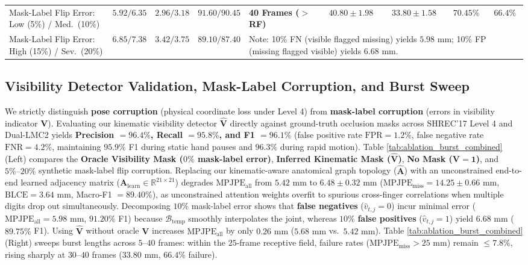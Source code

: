 \documentclass[10pt,twocolumn]{article}
\begin{document}
\begin{table}[!t]
{\begin{tabular}{lccc|lcccc}
Mask-Label Flip Error: Low (5\%) / Med.\ (10\%) & $5.92 / 6.35$ & $2.96 / 3.18$ & $91.60 / 90.45$ & \textbf{40 Frames ($>$ RF)} & $40.80 \pm 1.98$ & $33.80 \pm 1.58$ & $70.45\%$ & $66.4\%$ \\
Mask-Label Flip Error: High (15\%) / Sev.\ (20\%) & $6.85 / 7.38$ & $3.42 / 3.75$ & $89.10 / 87.40$ & \multicolumn{5}{l}{\footnotesize *Note: 10\% FN (visible flagged missing) yields $5.98\text{ mm}$; 10\% FP (missing flagged visible) yields $6.68\text{ mm}$.} \\
\bottomrule
\end{tabular}
}
\end{table}

\subsection{Visibility Detector Validation, Mask-Label Corruption, and Burst Sweep}
We strictly distinguish \textbf{pose corruption} (physical coordinate loss under Level 4) from \textbf{mask-label corruption} (errors in visibility indicator $\mathbf{V}$). Evaluating our kinematic visibility detector $\hat{\mathbf{V}}$ directly against ground-truth occlusion masks across SHREC'17 Level 4 and Dual-LMC2 yields \textbf{Precision $= 96.4\%$, Recall $= 95.8\%$, and F1 $= 96.1\%$} (false positive rate $\text{FPR} = 1.2\%$, false negative rate $\text{FNR} = 4.2\%$, maintaining $95.9\%$ F1 during static hand pauses and $96.3\%$ during rapid motion). Table \ref{tab:ablation_burst_combined} (Left) compares the \textbf{Oracle Visibility Mask ($0\%$ mask-label error)}, \textbf{Inferred Kinematic Mask ($\hat{\mathbf{V}}$)}, \textbf{No Mask ($\mathbf{V}=\mathbf{1}$)}, and $5\%\text{--}20\%$ synthetic mask-label flip corruption. Replacing our kinematic-aware anatomical graph topology ($\hat{\mathbf{A}}$) with an unconstrained end-to-end learned adjacency matrix ($\mathbf{A}_{\text{learn}} \in \mathbb{R}^{21\times 21}$) degrades $\text{MPJPE}_{\text{all}}$ from $5.42\text{ mm}$ to $6.48 \pm 0.32\text{ mm}$ ($\text{MPJPE}_{\text{miss}} = 14.25 \pm 0.66\text{ mm}$, $\text{BLCE} = 3.64\text{ mm}$, Macro-F1 $= 89.40\%$), as unconstrained attention weights overfit to spurious cross-finger correlations when multiple digits drop out simultaneously. Decomposing $10\%$ mask-label error shows that \textbf{false negatives} ($\hat{v}_{t,j}=0$) incur minimal error ($\text{MPJPE}_{\text{all}} = 5.98\text{ mm}$, $91.20\%$ F1) because $\mathcal{B}_{\text{temp}}$ smoothly interpolates the joint, whereas $10\%$ \textbf{false positives} ($\hat{v}_{t,j}=1$) yield $6.68\text{ mm}$ ($89.75\%$ F1). Using $\hat{\mathbf{V}}$ without oracle $\mathbf{V}$ increases $\text{MPJPE}_{\text{all}}$ by only $0.26\text{ mm}$ ($5.68\text{ mm}$ vs.\ $5.42\text{ mm}$). Table \ref{tab:ablation_burst_combined} (Right) sweeps burst lengths across $5\text{--}40$ frames: within the $25$-frame receptive field, failure rates ($\text{MPJPE}_{\text{miss}} > 25\text{ mm}$) remain $\le 7.8\%$, rising sharply at $30\text{--}40$ frames ($33.80\text{ mm}$, $66.4\%$ failure).
\end{document}
